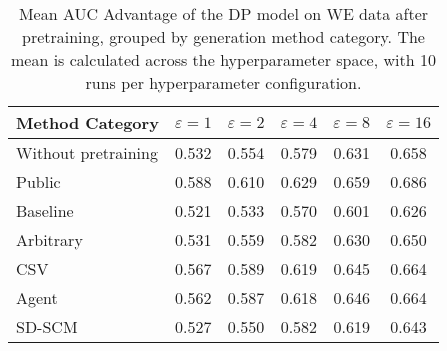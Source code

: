 \begin{table}[h!]
    \centering
    \caption{Mean AUC Advantage of the DP model on WE data after pretraining, grouped by generation method category. The mean is calculated across the hyperparameter space, with 10 runs per hyperparameter configuration.}
    \label{tab:epsilon_comparison}
    \begin{tabular}{lccccc}
    \toprule
    Method Category & $\varepsilon=1$ & $\varepsilon=2$ & $\varepsilon=4$ & $\varepsilon=8$ & $\varepsilon=16$ \\
    \midrule
    Without pretraining & 0.532 & 0.554 & 0.579 & 0.631 & \cellcolor{bronze!30}0.658 \\
    \arrayrulecolor{black!50!}\midrule
    Public & \cellcolor{gold!30}0.588 & \cellcolor{gold!30}0.610 & \cellcolor{gold!30}0.629 & \cellcolor{gold!30}0.659 & \cellcolor{gold!30}0.686 \\
    \arrayrulecolor{black!50!}\midrule
    Baseline & 0.521 & 0.533 & 0.570 & 0.601 & 0.626 \\
    \arrayrulecolor{black!50!}\midrule
    Arbitrary & 0.531 & 0.559 & 0.582 & 0.630 & 0.650 \\
    \arrayrulecolor{black!50!}\midrule
    CSV & \cellcolor{silver!30}0.567 & \cellcolor{silver!30}0.589 & \cellcolor{silver!30}0.619 & \cellcolor{bronze!30}0.645 & \cellcolor{silver!30}0.664 \\
    Agent & \cellcolor{bronze!30}0.562 & \cellcolor{bronze!30}0.587 & \cellcolor{bronze!30}0.618 & \cellcolor{silver!30}0.646 & \cellcolor{silver!30}0.664 \\
    SD-SCM & 0.527 & 0.550 & 0.582 & 0.619 & 0.643 \\
    \bottomrule
    \end{tabular}
\end{table}